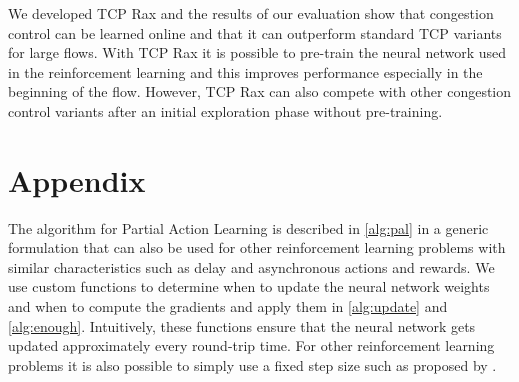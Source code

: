\documentclass[newfonts=false,format=sigconf,10pt,letterpaper]{acmart}
\begin{document}
We developed TCP Rax and the results of our evaluation show that congestion control can be learned online and that it can outperform standard TCP variants for large flows. With TCP Rax it is possible to pre-train the neural network used in the reinforcement learning and this improves performance especially in the beginning of the flow. However, TCP Rax can also compete with other congestion control variants after an initial exploration phase without pre-training.

\section*{Appendix}	

The algorithm for Partial Action Learning is described in \autoref{alg:pal} in a generic formulation that can also be used for other reinforcement learning problems with similar characteristics such as delay and asynchronous actions and rewards. We use custom functions to determine when to update the neural network weights and when to compute the gradients and apply them in \autoref{alg:update} and \autoref{alg:enough}. Intuitively, these functions ensure that the neural network gets updated approximately every round-trip time. For other reinforcement learning problems it is also possible to simply use a fixed step size such as proposed by \cite{mnih_asynchronous_2016}.
\end{document}
